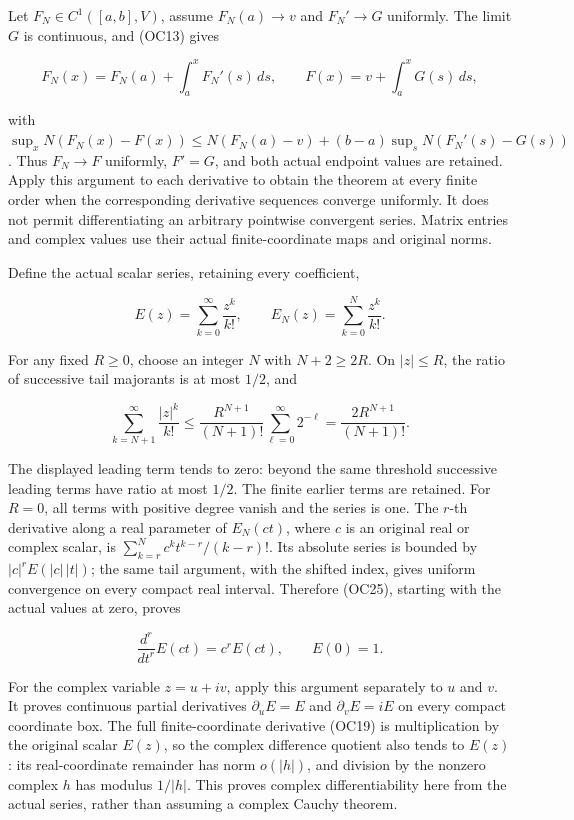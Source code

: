 \documentclass[
  11pt,
]{article}
\begin{document}
Let \(F_N\in C^1([a,b],V)\), assume \(F_N(a)\to v\) and \(F_N'\to G\)
uniformly. The limit \(G\) is continuous, and (OC13) gives

\[
 F_N(x)=F_N(a)+\int_a^x F_N'(s)\,ds,\qquad
 F(x)=v+\int_a^x G(s)\,ds,
\tag{OC25}
\]

with \(\sup_x N(F_N(x)-F(x))
\le N(F_N(a)-v)+(b-a)\sup_sN(F_N'(s)-G(s))\). Thus \(F_N\to F\)
uniformly, \(F'=G\), and both actual endpoint values are retained. Apply
this argument to each derivative to obtain the theorem at every finite
order when the corresponding derivative sequences converge uniformly. It
does not permit differentiating an arbitrary pointwise convergent
series. Matrix entries and complex values use their actual
finite-coordinate maps and original norms.

Define the actual scalar series, retaining every coefficient,

\[
 E(z)=\sum_{k=0}^\infty\frac{z^k}{k!},\qquad
 E_N(z)=\sum_{k=0}^N\frac{z^k}{k!}.
\tag{OC26}
\]

For any fixed \(R\ge0\), choose an integer \(N\) with \(N+2\ge2R\). On
\(|z|\le R\), the ratio of successive tail majorants is at most \(1/2\),
and

\[
 \sum_{k=N+1}^\infty\frac{|z|^k}{k!}
 \le\frac{R^{N+1}}{(N+1)!}
       \sum_{\ell=0}^\infty2^{-\ell}
 =\frac{2R^{N+1}}{(N+1)!}.
\tag{OC27}
\]

The displayed leading term tends to zero: beyond the same threshold
successive leading terms have ratio at most \(1/2\). The finite earlier
terms are retained. For \(R=0\), all terms with positive degree vanish
and the series is one. The \(r\)-th derivative along a real parameter of
\(E_N(ct)\), where \(c\) is an original real or complex scalar, is
\(\sum_{k=r}^N c^k t^{k-r}/(k-r)!\). Its absolute series is bounded by
\(|c|^r E(|c|\,|t|)\); the same tail argument, with the shifted index,
gives uniform convergence on every compact real interval. Therefore
(OC25), starting with the actual values at zero, proves

\[
 \frac{d^r}{dt^r}E(ct)=c^rE(ct),\qquad E(0)=1.
\tag{OC28}
\]

For the complex variable \(z=u+iv\), apply this argument separately to
\(u\) and \(v\). It proves continuous partial derivatives
\(\partial_uE=E\) and \(\partial_vE=iE\) on every compact coordinate
box. The full finite-coordinate derivative (OC19) is multiplication by
the original scalar \(E(z)\), so the complex difference quotient also
tends to \(E(z)\): its real-coordinate remainder has norm \(o(|h|)\),
and division by the nonzero complex \(h\) has modulus \(1/|h|\). This
proves complex differentiability here from the actual series, rather
than assuming a complex Cauchy theorem.
\end{document}
